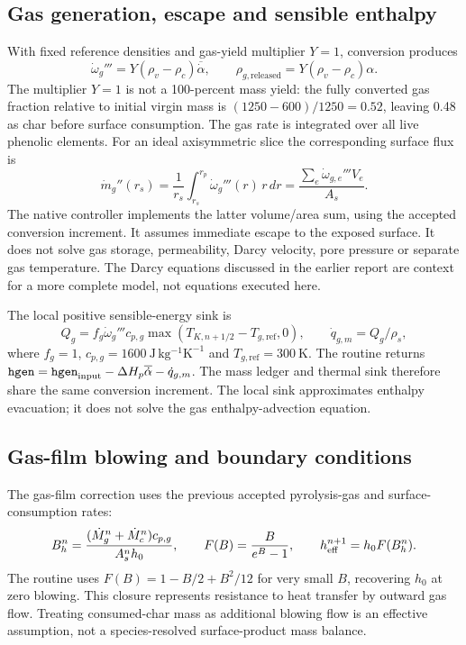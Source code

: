 \subsection{Gas generation, escape and sensible enthalpy}
With fixed reference densities and gas-yield multiplier $Y=1$, conversion produces
\begin{equation}
 \dot\omega_g'''=Y(\rho_v-\rho_c)\overline{\dot\alpha},\qquad
 \rho_{g,\mathrm{released}}=Y(\rho_v-\rho_c)\alpha.
\end{equation}
The multiplier $Y=1$ is not a 100-percent mass yield: the fully converted gas fraction relative to initial virgin mass is $(1250-600)/1250=0.52$, leaving 0.48 as char before surface consumption. The gas rate is integrated over all live phenolic elements. For an ideal axisymmetric slice the corresponding surface flux is
\begin{equation}
 \dot m_g''(r_s)=\frac{1}{r_s}\int_{r_s}^{r_p}\dot\omega_g'''(r)\,r\,dr
 =\frac{\sum_e\dot\omega_{g,e}'''V_e}{A_s}.
\end{equation}
The native controller implements the latter volume/area sum, using the accepted conversion increment. It assumes immediate escape to the exposed surface. It does not solve gas storage, permeability, Darcy velocity, pore pressure or separate gas temperature. The Darcy equations discussed in the earlier report are context for a more complete model, not equations executed here.

The local positive sensible-energy sink is
\begin{equation}
 Q_g=f_g\dot\omega_g'''c_{p,g}\max(T_{K,n+1/2}-T_{g,\mathrm{ref}},0),
 \qquad \dot q_{g,m}=Q_g/\rho_s,
\end{equation}
where $f_g=1$, $c_{p,g}=1600\ \mathrm{J\,kg^{-1}K^{-1}}$ and $T_{g,\mathrm{ref}}=300\ \mathrm K$. The routine returns $\texttt{hgen}=\texttt{hgen}_{\rm input}-\Delta H_p\overline{\dot\alpha}-\dot q_{g,m}$. The mass ledger and thermal sink therefore share the same conversion increment. The local sink approximates enthalpy evacuation; it does not solve the gas enthalpy-advection equation.

\subsection{Gas-film blowing and boundary conditions}
The gas-film correction uses the previous accepted pyrolysis-gas and surface-consumption rates:
\begin{equation}
 B_h^n=\frac{(\dot M_g^n+\dot M_c^n)c_{p,g}}{A_s^n h_0},\qquad
 F(B)=\frac{B}{e^B-1},\qquad h_{\rm eff}^{n+1}=h_0F(B_h^n).
\end{equation}
The routine uses $F(B)=1-B/2+B^2/12$ for very small $B$, recovering $h_0$ at zero blowing. This closure represents resistance to heat transfer by outward gas flow. Treating consumed-char mass as additional blowing flow is an effective assumption, not a species-resolved surface-product mass balance.

